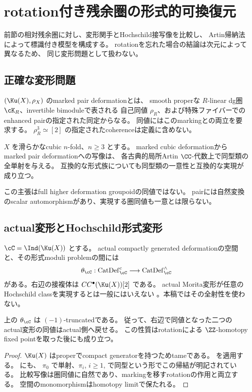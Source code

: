 \section{rotation付き残余圏の形式的可換復元}\label{sec:formal}

前節の相対残余圏に対し、変形関手とHochschild接写像を比較し、
Artin帰納法によって標識付き模型を構成する。
rotationを忘れた場合の結論は次元によって異なるため、
同じ変形問題として扱わない。

\subsection{正確な変形問題}

\begin{definition}
 \((\Ku(X),\rho_X)\) のmarked pair deformationとは、
 smooth properな \(R\)-linear dg圏 \(\cK_R\)、invertible bimoduleで表される
 自己同値 \(\rho_R\)、および特殊ファイバーでのenhanced pairの指定された同定からなる。
 同値にはこのmarkingとの両立を要求する。
 \(\rho_R^3\simeq[2]\) の指定されたcoherenceは定義に含めない。
\end{definition}

\begin{theorem}[pairの形式的復元]\label{thm:pair}
 \(X\) を滑らかなcubic \(n\)-fold、\(n\ge3\) とする。
 marked cubic deformationからmarked pair deformationへの写像は、
 各古典的局所Artin \(\CC\)-代数上で同型類の全単射を与える。
 互換的な形式族についても同型類の一意性と互換的な実現が成り立つ。
\end{theorem}

この主張はfull higher deformation groupoidの同値ではない。
pairには自然変換のscalar automorphismがあり、実現する圏同値も一意とは限らない。

\subsection{actual変形とHochschild形式変形}

\(\cC=\Ind(\Ku(X))\) とする。
actual compactly generated deformationの空間と、その形式moduli problemの間には
\[
 \theta_{\cC}:\operatorname{CatDef}_{\cC}^{c}
 \longrightarrow\operatorname{CatDef}_{\cC}^{\wedge}
\]
がある。右辺の接複体は \(CC^\bullet(\Ku(X))[2]\) である。
actual Morita変形が任意のHochschild classを実現するとは一般にはいえない
\cite{KL}。本稿ではその全射性を使わない。

\begin{lemma}\label{lem:theta}
 上の \(\theta_{\cC}\) は \((-1)\)-truncatedである。
 従って、右辺で同値となった二つのactual変形の同値はactual側へ戻せる。
 この性質はrotationによる \(\ZZ\)-homotopy fixed pointを取った後にも成り立つ。
\end{lemma}
\begin{proof}
 \(\Ku(X)\) はproperでcompact generatorを持つためtameである。
 \cite[Proposition 5.3.21, Theorem 5.1.9]{Lurie} を適用する。
 \cite[Definition 3.3, Section 3.3]{BKP} にも、
 \(\pi_0\) で単射、\(\pi_i\), \(i\ge1\), で同型という形でこの帰結が明記されている。
 比較写像は圏同値に自然であり、markingを移すrotationの作用と両立する。
 空間のmonomorphismはhomotopy limitで保たれる。
\end{proof}


